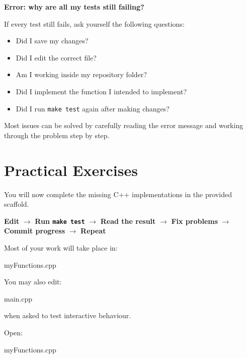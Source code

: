\documentclass{csc2059practical}
\begin{document}
\begin{commonerror}
\textbf{Error: why are all my tests still failing?}

If every test still fails, ask yourself the following questions:

\begin{itemize}
  \item Did I save my changes?
  \item Did I edit the correct file?
  \item Am I working inside my repository folder?
  \item Did I implement the function I intended to implement?
  \item Did I run \texttt{make test} again after making changes?
\end{itemize}

Most issues can be solved by carefully reading the error message and working through the problem step by step.
\end{commonerror}

\section{Practical Exercises}

You will now complete the missing C++ implementations in the provided scaffold.

\begin{workflowreminder}
\textbf{Edit} $\rightarrow$ \textbf{Run \texttt{make test}} $\rightarrow$ \textbf{Read the result} $\rightarrow$ \textbf{Fix problems} $\rightarrow$ \textbf{Commit progress} $\rightarrow$ \textbf{Repeat}
\end{workflowreminder}

Most of your work will take place in:

\begin{terminal}
myFunctions.cpp
\end{terminal}

You may also edit:

\begin{terminal}
main.cpp
\end{terminal}

when asked to test interactive behaviour.


Open:

\begin{terminal}
myFunctions.cpp
\end{terminal}
\end{document}
